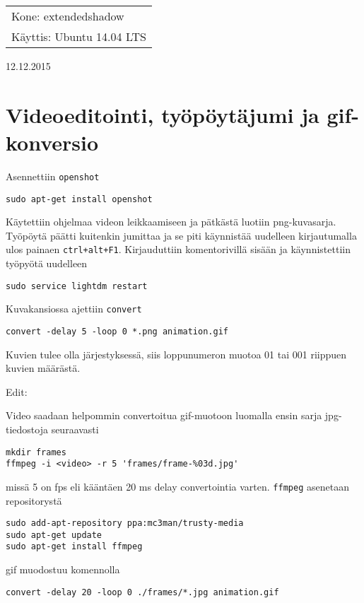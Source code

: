 \documentclass[main.tex]{subfiles}
\begin{document}
\thispagestyle{empty}
\begin{tabular}[t]{l}
Kone: extendedshadow\\
Käyttis: Ubuntu 14.04 LTS
\end{tabular}
\hfill 12.12.2015

{\section{Videoeditointi, työpöytäjumi ja gif-konversio}}

Asennettiin \texttt{openshot}

\begin{lstlisting}
sudo apt-get install openshot
\end{lstlisting}

Käytettiin ohjelmaa videon leikkaamiseen ja pätkästä luotiin png-kuvasarja. Työpöytä päätti kuitenkin jumittaa ja se piti käynnistää uudelleen kirjautumalla ulos painaen \texttt{ctrl+alt+F1}. Kirjauduttiin komentorivillä sisään ja käynnistettiin työpyötä uudelleen

\begin{lstlisting}
sudo service lightdm restart
\end{lstlisting}

Kuvakansiossa ajettiin \texttt{convert}

\begin{lstlisting}
convert -delay 5 -loop 0 *.png animation.gif
\end{lstlisting}

Kuvien tulee olla järjestyksessä, siis loppunumeron muotoa 01 tai 001 riippuen kuvien määrästä.

{\Large{Edit:}}

Video saadaan helpommin convertoitua gif-muotoon luomalla ensin sarja jpg-tiedostoja seuraavasti

\begin{lstlisting}
mkdir frames
ffmpeg -i <video> -r 5 'frames/frame-%03d.jpg'
\end{lstlisting}

missä 5 on fps eli kääntäen 20 ms delay convertointia varten. \texttt{ffmpeg} asenetaan repositorystä

\begin{lstlisting}
sudo add-apt-repository ppa:mc3man/trusty-media
sudo apt-get update
sudo apt-get install ffmpeg
\end{lstlisting}

gif muodostuu komennolla

\begin{lstlisting}
convert -delay 20 -loop 0 ./frames/*.jpg animation.gif
\end{lstlisting}
\end{document}
